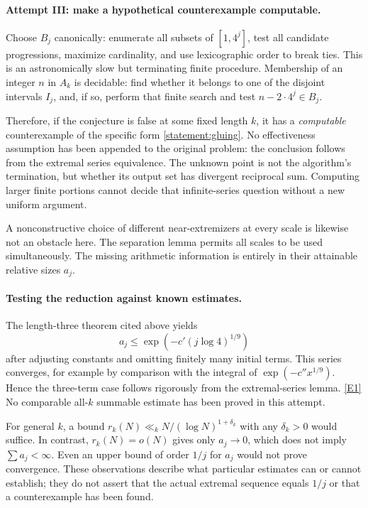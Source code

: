 \documentclass[11pt,a4paper]{article}
\newcommand{\eref}[2]{\hyperlink{extra:#1:#2}{[E#2]}}
\numberwithin{equation}{section}
\begin{document}
\paragraph{Attempt III: make a hypothetical counterexample computable.}
Choose $B_j$ canonically: enumerate all subsets of $[1,4^j]$, test
all candidate progressions, maximize cardinality, and use lexicographic
order to break ties.  This is an astronomically slow but terminating
finite procedure.  Membership of an integer $n$ in $A_k$ is decidable:
find whether it belongs to one of the disjoint intervals $I_j$, and,
if so, perform that finite search and test $n-2\cdot4^j\in B_j$.

Therefore, if the conjecture is false at some fixed length $k$, it
has a \emph{computable} counterexample of the specific form
\eqref{statement:gluing}.  No effectiveness assumption has been appended
to the original problem: the conclusion follows from the extremal
series equivalence.  The unknown point is not the algorithm's
termination, but whether its output set has divergent reciprocal sum.
Computing larger finite portions cannot decide that infinite-series
question without a new uniform argument.

A nonconstructive choice of different near-extremizers at every scale
is likewise not an obstacle here.  The separation lemma permits all
scales to be used simultaneously.  The missing arithmetic information
is entirely in their attainable relative sizes $a_j$.

\paragraph{Testing the reduction against known estimates.}
The length-three theorem cited above yields
\[
 a_j\leq\exp(-c'(j\log4)^{1/9})
\]
after adjusting constants and omitting finitely many initial terms.
This series converges, for example by comparison with the integral
of $\exp(-c''x^{1/9})$.  Hence the three-term case follows rigorously
from the extremal-series lemma. \eref{statement}{1}
No comparable all-$k$ summable estimate has been proved in this attempt.

For general $k$, a bound
$r_k(N)\ll_k N/(\log N)^{1+\delta_k}$ with any $\delta_k>0$ would
suffice.  In contrast, $r_k(N)=o(N)$ gives only $a_j\to0$, which does
not imply $\sum a_j<\infty$.  Even an upper bound of order $1/j$
for $a_j$ would not prove convergence.  These observations describe
what particular estimates can or cannot establish; they do not assert
that the actual extremal sequence equals $1/j$ or that a counterexample
has been found.
\end{document}
